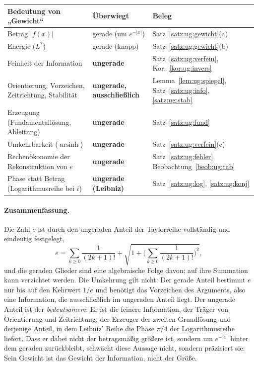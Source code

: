 \begin{center}
\small
\begin{tabular}{p{} p{} p{}}
\textbf{Bedeutung von „Gewicht“} & \textbf{Überwiegt} & \textbf{Beleg}\\\hline
Betrag $|f(x)|$ & gerade (um $e^{-|x|}$) & Satz~\ref{satz:ug:gewicht}(a)\\
Energie ($L^2$) & gerade (knapp) & Satz~\ref{satz:ug:gewicht}(b)\\
Feinheit der Information & \textbf{ungerade} & Satz~\ref{satz:ug:verfein}, Kor.~\ref{kor:ug:invers}\\
Orientierung, Vorzeichen, Zeitrichtung, Stabilität & \textbf{ungerade, ausschließlich} & Lemma~\ref{lem:ug:spiegel}, Satz~\ref{satz:ug:info}, \ref{satz:ug:stab}\\
Erzeugung (Fundamentallösung, Ableitung) & \textbf{ungerade} & Satz~\ref{satz:ug:fund}\\
Umkehrbarkeit ($\operatorname{arsinh}$) & \textbf{ungerade} & Satz~\ref{satz:ug:verfein}(c)\\
Rechenökonomie der Rekonstruktion von $e$ & \textbf{ungerade} & Satz~\ref{satz:ug:fehler}, Beobachtung~\ref{beob:ug:tab}\\
Phase statt Betrag (Logarithmusreihe bei $i$) & \textbf{ungerade (Leibniz)} & Satz~\ref{satz:ug:log}, \ref{satz:ug:konj}
\end{tabular}
\end{center}

\paragraph{Zusammenfassung.}
Die Zahl $e$ ist durch den ungeraden Anteil der Taylorreihe vollständig und eindeutig festgelegt,
\[
e=\sum_{k\ge0}\frac1{(2k+1)!}+\sqrt{1+\Big(\sum_{k\ge0}\frac1{(2k+1)!}\Big)^{2}},
\]
und die geraden Glieder sind eine algebraische Folge davon; auf ihre Summation kann verzichtet werden. Die Umkehrung gilt nicht: Der gerade Anteil bestimmt $e$ nur bis auf den Kehrwert $1/e$ und benötigt das Vorzeichen des Arguments, also eine Information, die ausschließlich im ungeraden Anteil liegt. Der ungerade Anteil ist der \emph{bedeutsamere}: Er ist die feinere Information, der Träger von Orientierung und Zeitrichtung, der Erzeuger der zweiten Grundlösung und derjenige Anteil, in dem Leibniz' Reihe die Phase $\pi/4$ der Logarithmusreihe liefert. Dass er dabei nicht der betragsmäßig größere ist, sondern um $e^{-|x|}$ hinter dem geraden zurückbleibt, schwächt diese Aussage nicht, sondern präzisiert sie: Sein Gewicht ist das Gewicht der Information, nicht der Größe.

